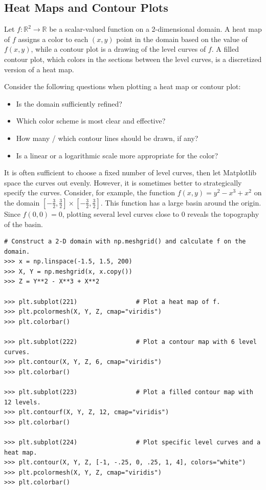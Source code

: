 \subsection*{Heat Maps and Contour Plots} %

Let $f:\mathbb{R}^2\rightarrow\mathbb{R}$ be a scalar-valued function on a 2-dimensional domain.
A heat map of $f$ assigns a color to each $(x,y)$ point in the domain based on the value of $f(x,y)$, while a contour plot is a drawing of the level curves of $f$.
A filled contour plot, which colors in the sections between the level curves, is a discretized version of a heat map.

Consider the following questions when plotting a heat map or contour plot:
%
\begin{itemize}
    \item Is the domain sufficiently refined?
    \item Which color scheme is most clear and effective?
    \item How many / which contour lines should be drawn, if any?
    \item Is a linear or a logarithmic scale more appropriate for the color?
\end{itemize}

It is often sufficient to choose a fixed number of level curves, then let Matplotlib space the curves out evenly.
However, it is sometimes better to strategically specify the curves.
Consider, for example, the function $f(x,y) = y^2 - x^3 + x^2$ on the domain $[-\frac{3}{2}, \frac{3}{2}] \times [-\frac{3}{2}, \frac{3}{2}]$.
This function has a large basin around the origin.
Since $f(0,0) = 0$, plotting several level curves close to $0$ reveals the topography of the basin.

\begin{lstlisting}
# Construct a 2-D domain with np.meshgrid() and calculate f on the domain.
>>> x = np.linspace(-1.5, 1.5, 200)
>>> X, Y = np.meshgrid(x, x.copy())
>>> Z = Y**2 - X**3 + X**2

>>> plt.subplot(221)                # Plot a heat map of f.
>>> plt.pcolormesh(X, Y, Z, cmap="viridis")
>>> plt.colorbar()

>>> plt.subplot(222)                # Plot a contour map with 6 level curves.
>>> plt.contour(X, Y, Z, 6, cmap="viridis")
>>> plt.colorbar()

>>> plt.subplot(223)                # Plot a filled contour map with 12 levels.
>>> plt.contourf(X, Y, Z, 12, cmap="viridis")
>>> plt.colorbar()

>>> plt.subplot(224)                # Plot specific level curves and a heat map.
>>> plt.contour(X, Y, Z, [-1, -.25, 0, .25, 1, 4], colors="white")
>>> plt.pcolormesh(X, Y, Z, cmap="viridis")
>>> plt.colorbar()
\end{lstlisting}

